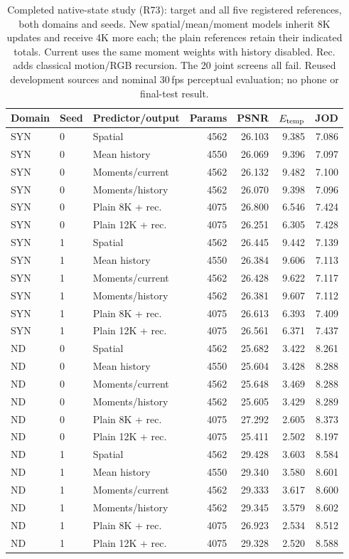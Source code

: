 \begin{table}[!htbp]
\centering\small\setlength{\tabcolsep}{4pt}
\caption{Completed native-state study (R73): target and all five registered references, both domains and seeds. New spatial/mean/moment models inherit 8K updates and receive 4K more each; the plain references retain their indicated totals. Current uses the same moment weights with history disabled. Rec. adds classical motion/RGB recursion. The 20 joint screens all fail. Reused development sources and nominal 30\,fps perceptual evaluation; no phone or final-test result.}
\label{tab:native-state}
\begin{tabular}{lllr rrr}
\toprule
Domain & Seed & Predictor/output & Params & PSNR & $E_{\rm temp}$ & JOD\\
\midrule
SYN & 0 & Spatial & 4562 & 26.103 & 9.385 & 7.086\\
SYN & 0 & Mean history & 4550 & 26.069 & 9.396 & 7.097\\
SYN & 0 & Moments/current & 4562 & 26.132 & 9.482 & 7.100\\
SYN & 0 & Moments/history & 4562 & 26.070 & 9.398 & 7.096\\
SYN & 0 & Plain 8K + rec. & 4075 & 26.800 & 6.546 & 7.424\\
SYN & 0 & Plain 12K + rec. & 4075 & 26.251 & 6.305 & 7.428\\
\midrule
SYN & 1 & Spatial & 4562 & 26.445 & 9.442 & 7.139\\
SYN & 1 & Mean history & 4550 & 26.384 & 9.606 & 7.113\\
SYN & 1 & Moments/current & 4562 & 26.428 & 9.622 & 7.117\\
SYN & 1 & Moments/history & 4562 & 26.381 & 9.607 & 7.112\\
SYN & 1 & Plain 8K + rec. & 4075 & 26.613 & 6.393 & 7.409\\
SYN & 1 & Plain 12K + rec. & 4075 & 26.561 & 6.371 & 7.437\\
\midrule
ND & 0 & Spatial & 4562 & 25.682 & 3.422 & 8.261\\
ND & 0 & Mean history & 4550 & 25.604 & 3.428 & 8.288\\
ND & 0 & Moments/current & 4562 & 25.648 & 3.469 & 8.288\\
ND & 0 & Moments/history & 4562 & 25.605 & 3.429 & 8.289\\
ND & 0 & Plain 8K + rec. & 4075 & 27.292 & 2.605 & 8.373\\
ND & 0 & Plain 12K + rec. & 4075 & 25.411 & 2.502 & 8.197\\
\midrule
ND & 1 & Spatial & 4562 & 29.428 & 3.603 & 8.584\\
ND & 1 & Mean history & 4550 & 29.340 & 3.580 & 8.601\\
ND & 1 & Moments/current & 4562 & 29.333 & 3.617 & 8.600\\
ND & 1 & Moments/history & 4562 & 29.345 & 3.579 & 8.602\\
ND & 1 & Plain 8K + rec. & 4075 & 26.923 & 2.534 & 8.512\\
ND & 1 & Plain 12K + rec. & 4075 & 29.328 & 2.520 & 8.588\\
\bottomrule
\end{tabular}
\end{table}

